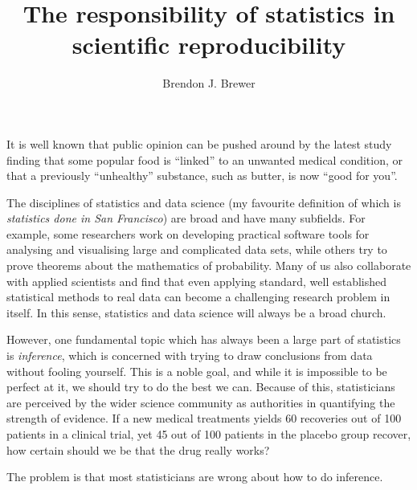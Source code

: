 \documentclass[a4paper, 11pt]{article}
\title{The responsibility of statistics in scientific reproducibility}
\author{Brendon J. Brewer}
\begin{document}
\maketitle

It is well known that public opinion can be pushed around by the latest study
finding that some popular food is ``linked'' to an unwanted medical condition,
or that a previously ``unhealthy'' substance, such as butter, is now
``good for you''.

The disciplines of statistics and data science
(my favourite definition of which is {\it statistics done in San Francisco})
are broad and have many subfields. For example, some researchers
work on developing practical software tools for analysing and visualising large and
complicated data sets, while others try to prove theorems about the mathematics
of probability. Many of us also collaborate with applied scientists and find
that even applying standard, well established statistical methods to
real data can become a challenging research problem in itself. In this sense,
statistics and data science will always be a broad church.

However, one fundamental topic which has always been a large part of
statistics is {\it inference}, which is concerned with trying to
draw conclusions from data without fooling yourself. This is a noble goal,
and while it is impossible to be perfect at it, we should try to do the best
we can. Because of this,
statisticians are perceived by the wider science community as authorities
in quantifying the strength of evidence. If a new medical treatments yields 60
recoveries out of 100 patients in a clinical trial, yet 45 out of 100 patients
in the placebo group recover, how certain should we be that the drug really works?

The problem is that most statisticians are wrong about how to do inference.
\end{document}
